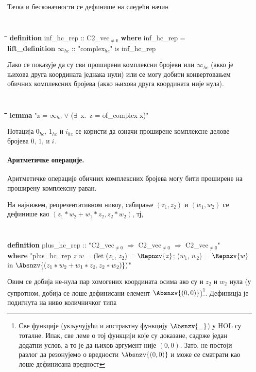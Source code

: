 \noindent Тачка и бесконачности се дефинише на следећи начин
{\tt
\begin{tabbing}
\hspace{5mm}\=\hspace{5mm}\=\hspace{5mm}\=\hspace{5mm}\=\hspace{5mm}\=\kill
{\bf definition} inf\_hc\_rep :: C2\_vec$_{\neq 0}$ {\bf where} inf\_hc\_rep = \\
{\bf lift\_definition} $\infty_{hc}$ :: "complex$_{hc}$" is inf\_hc\_rep
\end{tabbing}
}

Лако се показује да су сви проширени комплексни бројеви или
$\infty_{hc}$ (акко је њихова друга координата једнака нули) или се
могу добити конвертовањем обичних комплексних бројева (акко њихова
друга координата није нула).
{\tt
\begin{tabbing}
\hspace{5mm}\=\hspace{5mm}\=\hspace{5mm}\=\hspace{5mm}\=\hspace{5mm}\=\kill
{\bf lemma}  "z = $\infty_{hc}$ $\vee$ ($\exists$\ x.\ z = of\_complex x)"
\end{tabbing}
}

Нотација $0_{hc}$, $1_{hc}$ и $i_{hc}$ се користи да означи проширене
комплексне делове бројева $0$, $1$, и $i$.

\paragraph{Аритметичке операције.} Аритметичке операције обичних
комплексних бројева могу бити проширене на проширену комплексну
раван.

На најнижем, репрезентативном нивоу, сабирање $(z_1, z_2)$ и
$(w_1, w_2)$ се дефинише као $(z_1*w_2 + w_1*z_2, z_2*w_2)$, тј, 

{\tt
\begin{tabbing}
{\bf definition} plus\_hc\_rep :: "C2\_vec$_{\neq 0}$ $\Rightarrow$ C2\_vec$_{\neq 0}$ $\Rightarrow$ C2\_vec$_{\neq 0}$"\\
\hspace{5mm}\={\bf where} "plus\_hc\_rep $z$ $w$ = (l\=et \= ($z_1$, $z_2$) \== $\Repnzv{z}$; ($w_1$, $w_2$) = $\Repnzv{w}$ \\
  \> \> in $\Absnzv{(z_1*w_2 + w_1*z_2, z_2*w_2)})$"
\end{tabbing}
}
\noindent Овим се добија не-нула пар хомогених координата осима ако су
и $z_2$ и $w_2$ нула (у супротном, добија се лоше дефинисани елемент
{\tt $\Absnzv{(0, 0)}$})\footnote{Све функције (укључујући и
  апстрактну функцију $\Absnzv{\_}$) у HOL су тоталне. Ипак, све леме
  о тој функцији које су доказане, садрже један додатни услов, а то је
  да њихов аргумент није $(0, 0)$. Зато, не постоји разлог да
  резонујемо о вредности $\Absnzv{(0, 0)}$ и може се сматрати као лоше
  дефинисана вредност}. Дефиницја је подигнута на ниво количничког
типа

